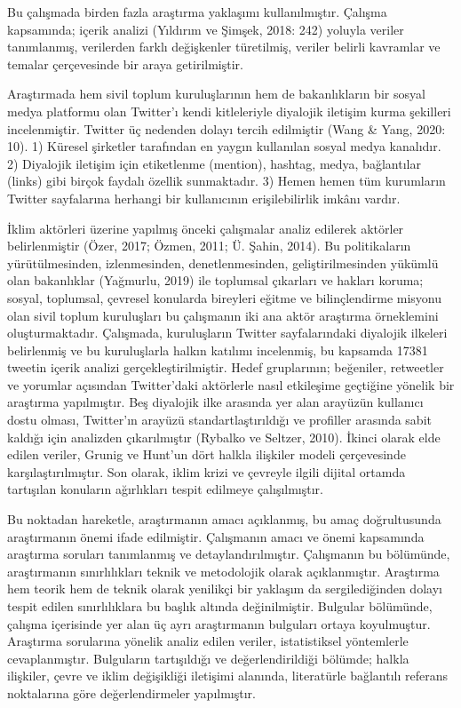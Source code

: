 \documentclass[
]{book}
\begin{document}
Bu çalışmada birden fazla araştırma yaklaşımı kullanılmıştır. Çalışma kapsamında; içerik analizi (Yıldırım ve Şimşek, 2018: 242) yoluyla veriler tanımlanmış, verilerden farklı değişkenler türetilmiş, veriler belirli kavramlar ve temalar çerçevesinde bir araya getirilmiştir.

Araştırmada hem sivil toplum kuruluşlarının hem de bakanlıkların bir sosyal medya platformu olan Twitter'ı kendi kitleleriyle diyalojik iletişim kurma şekilleri incelenmiştir. Twitter üç nedenden dolayı tercih edilmiştir (Wang \& Yang, 2020: 10). 1) Küresel şirketler tarafından en yaygın kullanılan sosyal medya kanalıdır. 2) Diyalojik iletişim için etiketlenme (mention), hashtag, medya, bağlantılar (links) gibi birçok faydalı özellik sunmaktadır. 3) Hemen hemen tüm kurumların Twitter sayfalarına herhangi bir kullanıcının erişilebilirlik imkânı vardır.

İklim aktörleri üzerine yapılmış önceki çalışmalar analiz edilerek aktörler belirlenmiştir (Özer, 2017; Özmen, 2011; Ü. Şahin, 2014). Bu politikaların yürütülmesinden, izlenmesinden, denetlenmesinden, geliştirilmesinden yükümlü olan bakanlıklar (Yağmurlu, 2019) ile toplumsal çıkarları ve hakları koruma; sosyal, toplumsal, çevresel konularda bireyleri eğitme ve bilinçlendirme misyonu olan sivil toplum kuruluşları bu çalışmanın iki ana aktör araştırma örneklemini oluşturmaktadır.
Çalışmada, kuruluşların Twitter sayfalarındaki diyalojik ilkeleri belirlenmiş ve bu kuruluşlarla halkın katılımı incelenmiş, bu kapsamda 17381 tweetin içerik analizi gerçekleştirilmiştir. Hedef gruplarının; beğeniler, retweetler ve yorumlar açısından Twitter'daki aktörlerle nasıl etkileşime geçtiğine yönelik bir araştırma yapılmıştır. Beş diyalojik ilke arasında yer alan arayüzün kullanıcı dostu olması, Twitter'ın arayüzü standartlaştırıldığı ve profiller arasında sabit kaldığı için analizden çıkarılmıştır (Rybalko ve Seltzer, 2010). İkinci olarak elde edilen veriler, Grunig ve Hunt'un dört halkla ilişkiler modeli çerçevesinde karşılaştırılmıştır. Son olarak, iklim krizi ve çevreyle ilgili dijital ortamda tartışılan konuların ağırlıkları tespit edilmeye çalışılmıştır.

Bu noktadan hareketle, araştırmanın amacı açıklanmış, bu amaç doğrultusunda araştırmanın önemi ifade edilmiştir. Çalışmanın amacı ve önemi kapsamında araştırma soruları tanımlanmış ve detaylandırılmıştır.
Çalışmanın bu bölümünde, araştırmanın sınırlılıkları teknik ve metodolojik olarak açıklanmıştır. Araştırma hem teorik hem de teknik olarak yenilikçi bir yaklaşım da sergilediğinden dolayı tespit edilen sınırlılıklara bu başlık altında değinilmiştir.
Bulgular bölümünde, çalışma içerisinde yer alan üç ayrı araştırmanın bulguları ortaya koyulmuştur. Araştırma sorularına yönelik analiz edilen veriler, istatistiksel yöntemlerle cevaplanmıştır. Bulguların tartışıldığı ve değerlendirildiği bölümde; halkla ilişkiler, çevre ve iklim değişikliği iletişimi alanında, literatürle bağlantılı referans noktalarına göre değerlendirmeler yapılmıştır.
\end{document}
